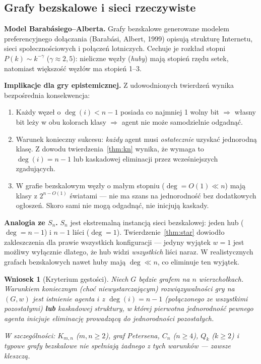 \documentclass[12pt,a4paper]{article}
\theoremstyle{plain}
\newtheorem{corollary}[theorem]{Wniosek}
\theoremstyle{definition}
\theoremstyle{remark}
\begin{document}
\subsection{Grafy bezskalowe i sieci rzeczywiste}
\label{sec:scalefree}

\textbf{Model Barabásiego–Alberta.} Grafy bezskalowe generowane modelem preferencyjnego dołączania (Barabási, Albert, 1999) opisują strukturę Internetu, sieci społecznościowych i połączeń lotniczych. Cechuje je rozkład stopni $P(k) \sim k^{-\gamma}$ ($\gamma \approx 2{,}5$): nieliczne węzły (\emph{huby}) mają stopień rzędu setek, natomiast większość węzłów ma stopień 1--3.

\textbf{Implikacje dla gry epistemicznej.} Z udowodnionych twierdzeń wynika bezpośrednia konsekwencja:
\begin{enumerate}
  \item Każdy węzeł o $\deg(i) < n-1$ posiada co najmniej 1 wolny bit $\Rightarrow$ własny bit leży w obu kolorach klasy $\Rightarrow$ agent nie może samodzielnie odgadnąć.
  \item Warunek konieczny sukcesu: \emph{każdy} agent musi \emph{ostatecznie} uzyskać jednorodną klasę. Z dowodu twierdzenia~\ref{thm:kn} wynika, że wymaga to $\deg(i) = n-1$ lub kaskadowej eliminacji przez wcześniejszych zgadujących.
  \item W grafie bezskalowym węzły o małym stopniu ($\deg = O(1) \ll n$) mają klasy z $2^{n-O(1)}$ światami — nie ma szans na jednorodność bez dodatkowych ogłoszeń. Skoro sami nie mogą odgadnąć, nie inicjują kaskady.
\end{enumerate}

\textbf{Analogia ze $S_n$.} $S_n$ jest ekstremalną instancją sieci bezskalowej: jeden hub ($\deg = n-1$) i $n-1$ liści ($\deg = 1$). Twierdzenie~\ref{thm:star} dowiodło zakleszczenia dla prawie wszystkich konfiguracji — jedyny wyjątek $w=1$ jest możliwy wyłącznie dlatego, że hub widzi \emph{wszystkich} liści naraz. W realistycznych grafach bezskalowych nawet huby mają $\deg \ll n$, co eliminuje ten wyjątek.

\begin{corollary}[Kryterium gęstości]
\label{cor:density}
Niech $G$ będzie grafem na $n$ wierzchołkach. Warunkiem koniecznym (choć niewystarczającym) rozwiązywalności gry na $(G, w)$ jest istnienie agenta $i$ z $\deg(i) = n-1$ (połączonego ze wszystkimi pozostałymi) \textbf{lub} kaskadowej struktury, w której pierwotna jednorodność pewnego agenta inicjuje eliminację prowadzącą do jednorodności pozostałych.

W szczególności: $K_{m,n}$ ($m,n \ge 2$), graf Petersena, $C_n$ ($n \ge 4$), $Q_k$ ($k \ge 2$) i typowe grafy bezskalowe nie spełniają żadnego z tych warunków — zawsze kleszczą.
\end{corollary}
\end{document}
